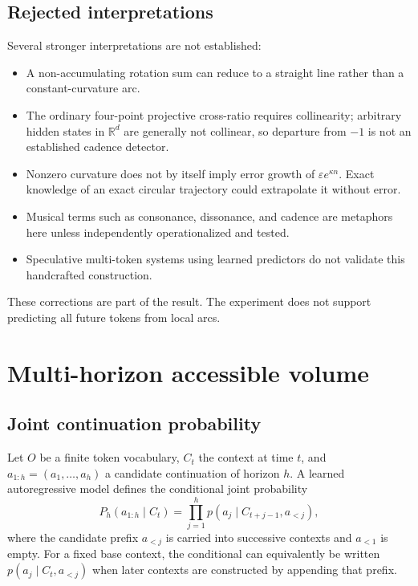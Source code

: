 \documentclass[11pt,a4paper]{article}
\begin{document}
\subsection{Rejected interpretations}
Several stronger interpretations are not established:
\begin{itemize}[nosep]
  \item A non-accumulating rotation sum can reduce to a straight line rather than a constant-curvature arc.
  \item The ordinary four-point projective cross-ratio requires collinearity; arbitrary hidden states in $\mathbb{R}^d$ are generally not collinear, so departure from $-1$ is not an established cadence detector.
  \item Nonzero curvature does not by itself imply error growth of $\varepsilon e^{\kappa n}$. Exact knowledge of an exact circular trajectory could extrapolate it without error.
  \item Musical terms such as consonance, dissonance, and cadence are metaphors here unless independently operationalized and tested.
  \item Speculative multi-token systems using learned predictors do not validate this handcrafted construction.
\end{itemize}
These corrections are part of the result. The experiment does not support predicting all future tokens from local arcs.

\section{Multi-horizon accessible volume}
\subsection{Joint continuation probability}
Let $O$ be a finite token vocabulary, $C_t$ the context at time $t$, and $a_{1:h}=(a_1,\ldots,a_h)$ a candidate continuation of horizon $h$. A learned autoregressive model defines the conditional joint probability
\begin{equation}
P_h(a_{1:h}\mid C_t)=\prod_{j=1}^{h}p(a_j\mid C_{t+j-1},a_{<j}),
\label{eq:joint-continuation}
\end{equation}
where the candidate prefix $a_{<j}$ is carried into successive contexts and $a_{<1}$ is empty. For a fixed base context, the conditional can equivalently be written $p(a_j\mid C_t,a_{<j})$ when later contexts are constructed by appending that prefix.
\end{document}
